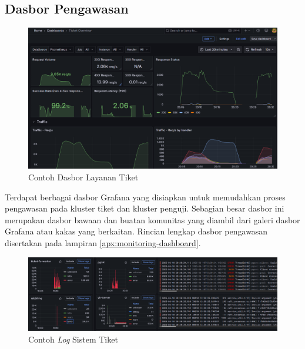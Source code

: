 \subsection{Dasbor Pengawasan}

\begin{figure}[htbp]
    \centering
    \includegraphics[width=1\textwidth]{resources/chapter-4/ticket-dashboard.png}
    \caption{Contoh Dasbor Layanan Tiket}
    \label{fig:ticket-dashboard-example}
\end{figure}

Terdapat berbagai dasbor Grafana yang disiapkan untuk memudahkan proses pengawasan pada kluster tiket dan kluster penguji. Sebagian besar dasbor ini merupakan dasbor bawaan dan buatan komunitas yang diambil dari galeri dasbor Grafana atau kakas yang berkaitan. Rincian lengkap dasbor pengawasan disertakan pada lampiran \ref{apx:monitoring-dashboard}.

\begin{figure}[htbp]
    \centering
    \includegraphics[width=1\textwidth]{resources/chapter-4/log.png}
    \caption{Contoh \textit{Log} Sistem Tiket}
    \label{fig:log-example}
\end{figure}
